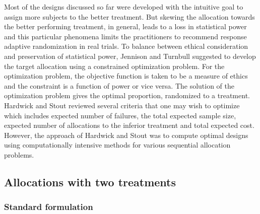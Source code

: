 Most of the designs discussed so far were developed with the intuitive goal to assign more subjects to the better treatment. But skewing the allocation towards the better performing treatment, in general,  leads to a loss in statistical power and this particular phenomena limits the practitioners  to recommend response adaptive randomization in real trials. To balance between ethical consideration and preservation of statistical power, Jennison and Turnbull\cite{41} suggested to develop the target allocation using a constrained optimization problem.  For the optimization problem, the objective function is taken to be a measure of ethics and the constraint is a function of power or vice versa. The solution of the optimization problem gives the optimal proportion, randomized to a treatment. Hardwick and Stout\cite{42} reviewed several criteria that one may wish to optimize which includes  expected number of failures, the total expected sample size, expected number of allocations to the inferior treatment and total expected cost. However, the approach of  Hardwick and Stout\cite{42} was to compute optimal designs using computationally intensive methods for various sequential allocation problems.

\subsection{Allocations with two treatments}

\subsubsection{Standard formulation}

